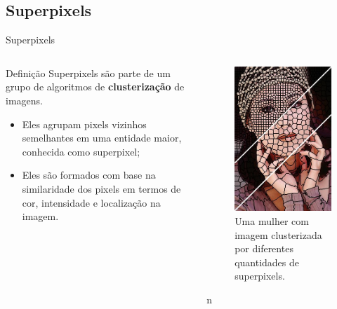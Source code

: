 \documentclass{templatebeamerufc/libs/ufc_format}
\begin{document}
\subsection{Superpixels}
\begin{frame}{Superpixels}
  \begin{columns}{}

    \begin{column}{0.6\textwidth}
      \begin{block}{Definição}
        Superpixels são parte de um grupo de algoritmos de
        \textbf{clusterização} de imagens.
      \end{block}

      \begin{itemize}
      \item Eles agrupam pixels vizinhos semelhantes em uma entidade
        maior, conhecida como superpixel;
      \item Eles são formados com base na similaridade dos pixels em
        termos de cor, intensidade e localização na imagem.
      \end{itemize}
    \end{column}

    \begin{column}{0.5\textwidth}
      \begin{figure}\label{fig:superpixel-variation}
        \centering
        \caption{Uma mulher com imagem clusterizada por diferentes
          quantidades de superpixels.}
        \includegraphics[scale=0.32]{figuras/superpixel-variation}
      \end{figure}n
    \end{column}
  \end{columns}
\end{frame}
\end{document}
